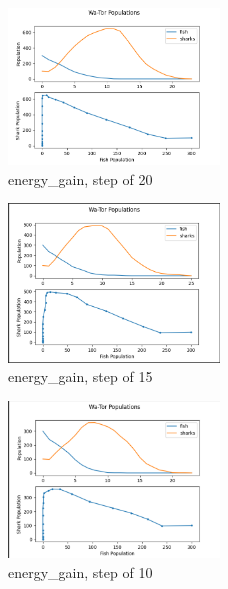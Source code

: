 \documentclass[12pt]{iopart} %
\begin{document}
\begin{figure}[h!tbp]
  \begin{center}
  \item[]\includegraphics[width=0.5\textwidth]{figure17.png}
  \caption{\label{fig:figure17}
  energy\_gain, step of 20
  }
  \end{center}
\end{figure}

\begin{figure}[h!tbp]
  \begin{center}
  \item[]\includegraphics[width=0.5\textwidth]{figure18.png}
  \caption{\label{fig:figure18}
  energy\_gain, step of 15
  }
  \end{center}
\end{figure}

\begin{figure}[h!tbp]
  \begin{center}
  \item[]\includegraphics[width=0.5\textwidth]{figure19.png}
  \caption{\label{fig:figure19}
  energy\_gain, step of 10
  }
  \end{center}
\end{figure}
\end{document}
